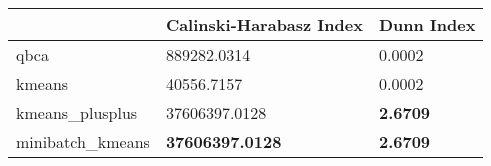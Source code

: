 \begin{table}[htbp]
\centering
\begin{tabular}{lll}
\toprule
 & Calinski-Harabasz Index & Dunn Index \\
\midrule
qbca & 889282.0314 & 0.0002 \\
kmeans & 40556.7157 & 0.0002 \\
kmeans_plusplus & 37606397.0128 & \textbf{2.6709} \\
minibatch_kmeans & \textbf{37606397.0128} & \textbf{2.6709} \\
\bottomrule
\end{tabular}
\end{table}
